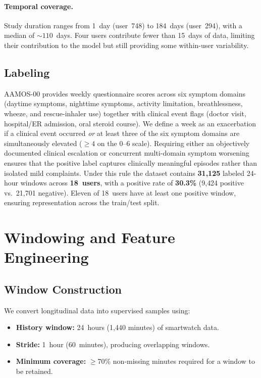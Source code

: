 \documentclass[11pt,a4paper]{article}
\begin{document}
\paragraph{Temporal coverage.}
Study duration ranges from 1~day (user~748) to 184~days (user~294), with a
median of ${\sim}110$~days.  Four users contribute fewer than 15~days of data,
limiting their contribution to the model but still providing some within-user
variability.

\subsection{Labeling}

AAMOS-00 provides weekly questionnaire scores across six symptom domains
(daytime symptoms, nighttime symptoms, activity limitation, breathlessness,
wheeze, and rescue-inhaler use) together with clinical event flags (doctor
visit, hospital/ER admission, oral steroid course).  We define a week as
an exacerbation if a clinical event occurred \emph{or} at least three of
the six symptom domains are simultaneously elevated ($\geq 4$ on the 0--6
scale).  Requiring either an objectively documented clinical escalation or
concurrent multi-domain symptom worsening ensures that the positive label
captures clinically meaningful episodes rather than isolated mild complaints.
Under this rule the dataset contains \textbf{31{,}125} labeled 24-hour
windows across \textbf{18~users}, with a positive rate of
\textbf{30.3\%} (9{,}424 positive vs.\ 21{,}701 negative).  Eleven of
18~users have at least one positive window, ensuring representation across
the train/test split.

\section{Windowing and Feature Engineering}\label{sec:features}

\subsection{Window Construction}

We convert longitudinal data into supervised samples using:
\begin{itemize}[nosep]
  \item \textbf{History window:} 24~hours (1{,}440 minutes) of smartwatch data.
  \item \textbf{Stride:} 1~hour (60~minutes), producing overlapping windows.
  \item \textbf{Minimum coverage:} $\geq$70\% non-missing minutes required for
        a window to be retained.
\end{itemize}
\end{document}
